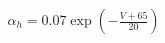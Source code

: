 \documentclass[preview]{standalone}
\begin{document}
\begin{align*}
\alpha_h = 0.07 \exp \left( -\frac{V + 65}{20} \right)
\end{align*}
\end{document}
